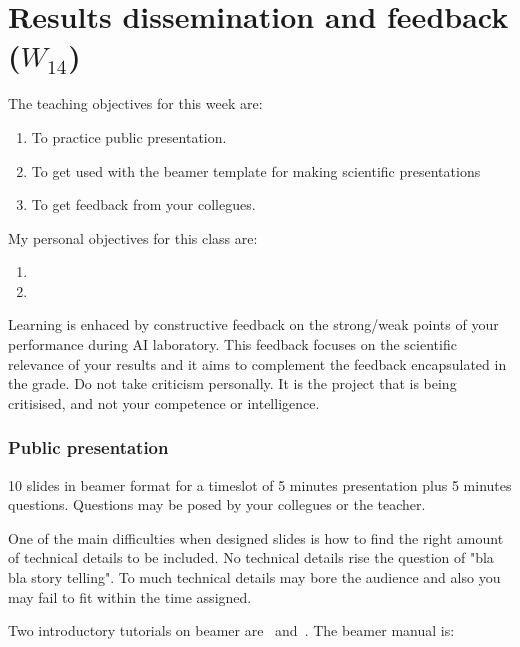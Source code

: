 \documentclass[a4paper,12pt]{report}
\begin{document}
\vspace{0.5cm}


\chapter{Results dissemination and feedback ($W_{14}$)}

The teaching objectives for this week are:
\begin{enumerate}
\item To practice public presentation.
\item To get used with the beamer template for making scientific presentations
 \item To get feedback from your collegues. 
\end{enumerate}

\vspace{0.5cm}

My personal objectives for this class are:
\begin{enumerate}
 \item 
 \item 
\end{enumerate}

Learning is enhaced by constructive feedback on the strong/weak points of your performance during AI laboratory. 
This feedback focuses on the scientific relevance of your results and it aims to complement the feedback encapsulated in the grade.
Do not take criticism personally. 
It is the project that is being critisised, and not your competence or intelligence. 


\subsection{Public presentation}
10 slides in beamer format for a timeslot of 5 minutes presentation plus 5 minutes questions.
Questions may be posed by your collegues or the teacher. 

One of the main difficulties when designed slides is how to find the right amount of 
technical details to be included. 
No technical details rise the question of "bla bla story telling". 
To much technical details may bore the audience and also you may fail to fit within the time assigned. 

Two introductory tutorials on beamer are~\cite{mertz2005beamer} and~\cite{batts2007beamer}.
The beamer manual is: 
\end{document}
